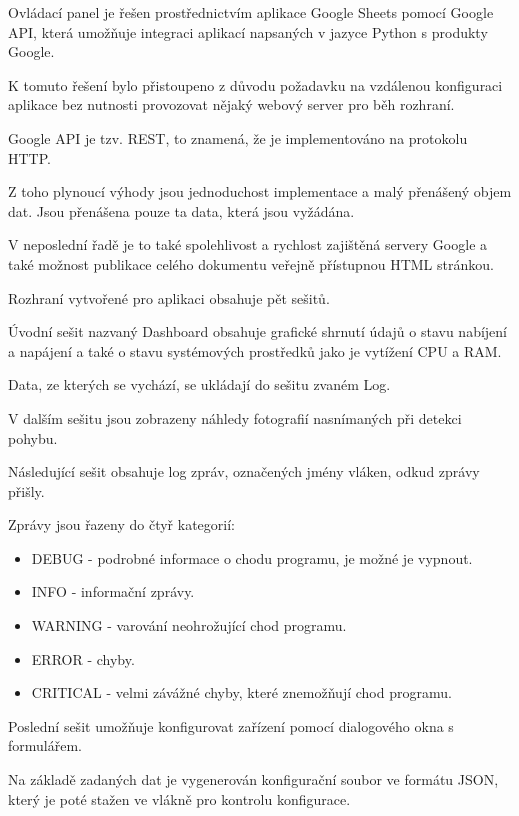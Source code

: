 Ovládací panel je řešen prostřednictvím aplikace Google Sheets pomocí Google API, která umožňuje integraci aplikací napsaných v jazyce Python s produkty Google.

K tomuto řešení bylo přistoupeno z důvodu požadavku na vzdálenou konfiguraci aplikace bez nutnosti provozovat nějaký webový server pro běh rozhraní.

Google API je tzv. REST, to znamená, že je implementováno na protokolu HTTP.

Z toho plynoucí výhody jsou jednoduchost implementace a malý přenášený objem dat. Jsou přenášena pouze ta data, která jsou vyžádána.

V neposlední řadě je to také spolehlivost a rychlost zajištěná servery Google a také možnost publikace celého dokumentu veřejně přístupnou HTML stránkou. 

Rozhraní vytvořené pro aplikaci obsahuje pět sešitů.

Úvodní sešit nazvaný Dashboard obsahuje grafické shrnutí údajů o stavu nabíjení a napájení a také o stavu systémových prostředků jako je vytížení CPU a RAM.

Data, ze kterých se vychází, se ukládají do sešitu zvaném Log.

V dalším sešitu jsou zobrazeny náhledy fotografií nasnímaných při detekci pohybu.

Následující sešit obsahuje log zpráv, označených jmény vláken, odkud zprávy přišly.

Zprávy jsou řazeny do čtyř kategorií:
\begin{itemize}
    \item DEBUG - podrobné informace o chodu programu, je možné je vypnout. 
    \item INFO - informační zprávy.
    \item WARNING - varování neohrožující chod programu.
    \item ERROR - chyby.
    \item CRITICAL - velmi závážné chyby, které znemožňují chod programu.
\end{itemize}

Poslední sešit umožňuje konfigurovat zařízení pomocí dialogového okna s formulářem.

Na základě zadaných dat je vygenerován konfigurační soubor ve formátu JSON, který je poté stažen ve vlákně pro kontrolu konfigurace.

